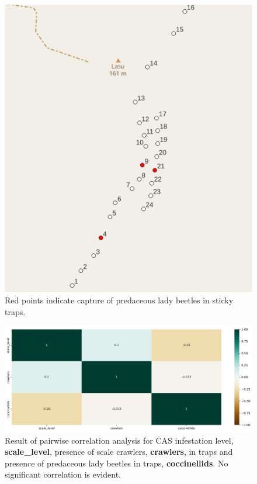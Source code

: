 \documentclass[12pt,letterpaper,english,bibliography=totocnumbered, abstract=on]{scrartcl}
\begin{document}
\begin{figure}[p]
	\centering
	\includegraphics[width=\linewidth]{../sticky_traps/coccinellids}
	\caption{Red points indicate capture of predaceous lady beetles in sticky traps.}
	\label{fig:coccinellids}
\end{figure}

\begin{figure}[p]
	\centering
	\includegraphics[width=\linewidth]{../sticky_traps/heatmap}
	\caption{Result of pairwise correlation analysis for CAS infestation level, \textbf{scale\_level}, presence of scale crawlers, \textbf{crawlers}, in traps and presence of predaceous lady beetles in traps, \textbf{coccinellids}. No significant correlation is evident.}
	\label{fig:heatmap}
\end{figure}
\end{document}
